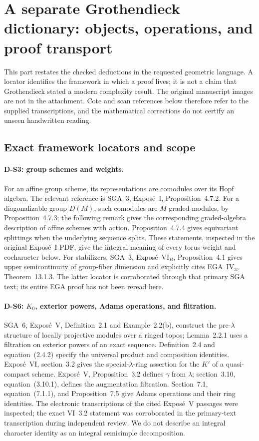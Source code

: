\section{A separate Grothendieck dictionary: objects, operations, and proof transport}
\label{sec:grothendieck-dictionary}

This part restates the checked deductions in the requested geometric language. A locator identifies the framework in which a proof lives; it is not a claim that Grothendieck stated a modern complexity result. The original manuscript images are not in the attachment. Cote and scan references below therefore refer to the supplied transcriptions, and the mathematical corrections do not certify an unseen handwritten reading.

\subsection{Exact framework locators and scope}

\paragraph{D-S3: group schemes and weights.}
For an affine group scheme, its representations are comodules over its Hopf algebra. The relevant reference is SGA~3, Expos\'e~I, Proposition~4.7.2. For a diagonalizable group $D(M)$, such comodules are $M$-graded modules, by Proposition~4.7.3; the following remark gives the corresponding graded-algebra description of affine schemes with action. Proposition~4.7.4 gives equivariant splittings when the underlying sequence splits. These statements, inspected in the original Expos\'e~I PDF, give the integral meaning of every torus weight and cocharacter below. For stabilizers, SGA~3, Expos\'e~VI$_B$, Proposition~4.1 gives upper semicontinuity of group-fiber dimension and explicitly cites EGA~IV$_3$, Theorem~13.1.3. The latter locator is corroborated through that primary SGA text; its entire EGA proof has not been reread here.

\paragraph{D-S6: $K_0$, exterior powers, Adams operations, and filtration.}
SGA~6, Expos\'e~V, Definition~2.1 and Example~2.2(b), construct the pre-$\lambda$ structure of locally projective modules over a ringed topos; Lemma~2.2.1 uses a filtration on exterior powers of an exact sequence. Definition~2.4 and equation~(2.4.2) specify the universal product and composition identities. Expos\'e~VI, section~3.2 gives the special-$\lambda$-ring assertion for the $K'$ of a quasi-compact scheme. Expos\'e~V, Proposition~3.2 defines $\gamma$ from $\lambda$; section~3.10, equation~(3.10.1), defines the augmentation filtration. Section~7.1, equation~(7.1.1), and Proposition~7.5 give Adams operations and their ring identities. The electronic transcriptions of the cited Expos\'e~V passages were inspected; the exact VI~3.2 statement was corroborated in the primary-text transcription during independent review. We do not describe an integral character identity as an integral semisimple decomposition.

